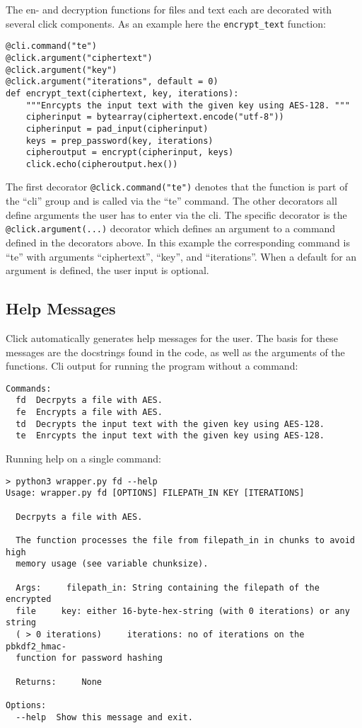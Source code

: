 The en- and decryption functions for files and text each are decorated with several click components. As an example here the \lstinline{encrypt_text} function:

\begin{lstlisting}
@cli.command("te")
@click.argument("ciphertext")
@click.argument("key")
@click.argument("iterations", default = 0)
def encrypt_text(ciphertext, key, iterations):
    """Enrcypts the input text with the given key using AES-128. """
    cipherinput = bytearray(ciphertext.encode("utf-8"))
    cipherinput = pad_input(cipherinput)
    keys = prep_password(key, iterations)
    cipheroutput = encrypt(cipherinput, keys)
    click.echo(cipheroutput.hex())
\end{lstlisting}


The first decorator \lstinline{@click.command("te")} denotes that the function is part of the \enquote{cli} group and is called via the \enquote{te} command. The other decorators all define arguments the user has to enter via the cli. The specific decorator is the \lstinline{@click.argument(...)} decorator which defines an argument to a command defined in the decorators above. In this example the corresponding command is \enquote{te} with arguments \enquote{ciphertext}, \enquote{key}, and \enquote{iterations}. When a default for an argument is defined, the user input is optional.

\subsection{Help Messages}
Click automatically generates help messages for the user. The basis for these messages are the docstrings found in the code, as well as the arguments of the functions. Cli output for running the program without a command:
\begin{lstlisting}
Commands:
  fd  Decrpyts a file with AES.
  fe  Encrypts a file with AES.
  td  Decrypts the input text with the given key using AES-128.
  te  Enrcypts the input text with the given key using AES-128.
\end{lstlisting}

Running help on a single command:
\begin{lstlisting}
> python3 wrapper.py fd --help
Usage: wrapper.py fd [OPTIONS] FILEPATH_IN KEY [ITERATIONS]

  Decrpyts a file with AES.

  The function processes the file from filepath_in in chunks to avoid high
  memory usage (see variable chunksize).

  Args:     filepath_in: String containing the filepath of the encrypted
  file     key: either 16-byte-hex-string (with 0 iterations) or any string
  ( > 0 iterations)     iterations: no of iterations on the pbkdf2_hmac-
  function for password hashing

  Returns:     None

Options:
  --help  Show this message and exit.
\end{lstlisting}
